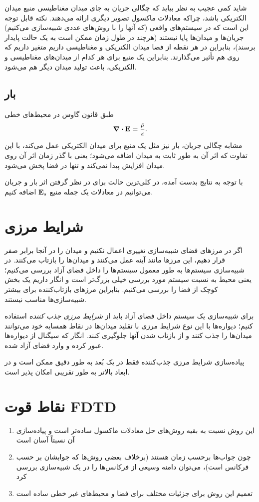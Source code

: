 \documentclass[12pt,a4paper]{article}
\begin{document}
	شاید کمی عجیب به نظر بیاید که چگالی جریان به جای میدان مغناطیسی منبع میدان الکتریکی باشد، چراکه معادلات ماکسول تصویر دیگری ارائه می‌دهند.
	نکته قابل توجه این است که در سیستم‌های واقعی (که آنها را با روش‌های عددی شبیه‌سازی می‌کنیم) جریان‌ها و میدان‌ها پایا نیستند
	(هرچند در طول زمان ممکن است به یک حالت پایدار برسند)، بنابراین در هر نقطه از فضا میدان الکتریکی و مغناطیسی داریم متغیر داریم که روی هم تأثیر می‌گذارند.
	بنابراین یک منبع برای هر کدام از میدان‌های مغناطیسی و الکتریکی، باعث تولید میدان دیگر هم می‌شود.
	\subsection{بار}
	طبق قانون گاوس در محیط‌های خطی
	\begin{equation}
		\div{\vb{E}} = \frac{\rho}{\epsilon}.
	\end{equation}
	مشابه چگالی جریان، بار نیز مثل یک منبع برای میدان الکتریکی عمل می‌کند، با این تفاوت که اثر آن به طور ثابت به میدان اضافه می‌شود؛
	یعنی با گذر زمان اثر آن روی میدان افزایش پیدا نمی‌کند و تنها در فضا پخش می‌شود.
	
	با توجه به نتایج بدست آمده، در کلی‌ترین حالت برای در نظر گرفتن اثر بار و جریان می‌توانیم در معادلات یک جمله منبع $\vb{E}_s$ اضافه کنیم.
	\section{شرایط مرزی}
	اگر در مرزهای فضای شبیه‌سازی تغییری اعمال نکنیم و میدان را در آنجا برابر صفر قرار دهیم، این مرزها مانند آینه عمل می‌کنند
	و میدان‌ها را بازتاب می‌کنند. در شبیه‌سازی سیستم‌ها به طور معمول سیستم‌ها را داخل فضای آزاد بررسی می‌کنیم؛
	یعنی محیط به نسبت سیستم مورد بررسی خیلی بزرگ‌تر است و انگار داریم یک بخش کوچک از فضا را بررسی می‌کنیم.
	بنابراین مرزهای بازتاب‌کننده برای بیشتر شبیه‌سازی‌ها مناسب نیستند.
	
	برای شبیه‌سازی یک سیستم داخل فضای آزاد باید از \emph{شرایط مرزی جذب کننده} استفاده کنیم؛
	دیواره‌ها با این نوع شرایط مرزی با تقلید میدان‌ها در نقاط همسایه خود می‌توانند میدان‌ها را جذب کنند و از بازتاب شدن آنها جلوگیری کنند.
	انگار که سیگنال از دیواره‌ها عبور کرده و وارد فضای آزاد شده.
	
	پیاده‌سازی شرایط مرزی جذب‌کننده فقط در یک بُعد به طور دقیق ممکن است و در ابعاد بالاتر به طور تقریبی امکان پذیر است.
	\section{نقاط قوت FDTD}
	\begin{enumerate}
		\item این روش نسبت به بقیه روش‌های حل معادلات ماکسول ساده‌تر است و پیاده‌سازی آن نسبتاً آسان است
		\item چون جواب‌ها برحسب زمان هستند (برخلاف بعضی روش‌ها که جوابشان بر حسب فرکانس است)، می‌توان دامنه وسیعی از فرکانس‌ها را در یک شبیه‌سازی بررسی کرد
		\item تعمیم این روش برای جزئیات مختلف برای فضا و محیط‌های غیر خطی ساده است 
	\end{enumerate}
\end{document}
